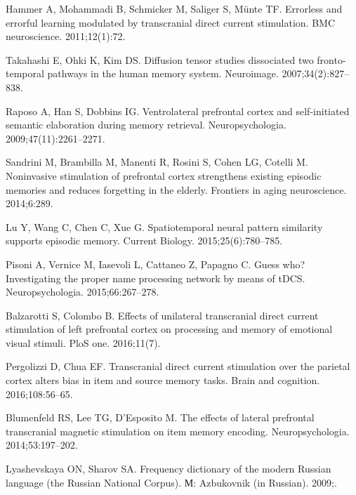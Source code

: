 \documentclass[10pt,letterpaper]{article}
\begin{document}
\begin{thebibliography}{10}
Hammer A, Mohammadi B, Schmicker M, Saliger S, M{\"u}nte TF.
\newblock Errorless and errorful learning modulated by transcranial direct
  current stimulation.
\newblock BMC neuroscience. 2011;12(1):72.

Takahashi E, Ohki K, Kim DS.
\newblock Diffusion tensor studies dissociated two fronto-temporal pathways in
  the human memory system.
\newblock Neuroimage. 2007;34(2):827--838.

Raposo A, Han S, Dobbins IG.
\newblock Ventrolateral prefrontal cortex and self-initiated semantic
  elaboration during memory retrieval.
\newblock Neuropsychologia. 2009;47(11):2261--2271.

Sandrini M, Brambilla M, Manenti R, Rosini S, Cohen LG, Cotelli M.
\newblock Noninvasive stimulation of prefrontal cortex strengthens existing
  episodic memories and reduces forgetting in the elderly.
\newblock Frontiers in aging neuroscience. 2014;6:289.

Lu Y, Wang C, Chen C, Xue G.
\newblock Spatiotemporal neural pattern similarity supports episodic memory.
\newblock Current Biology. 2015;25(6):780--785.

Pisoni A, Vernice M, Iasevoli L, Cattaneo Z, Papagno C.
\newblock Guess who? Investigating the proper name processing network by means
  of tDCS.
\newblock Neuropsychologia. 2015;66:267--278.

Balzarotti S, Colombo B.
\newblock Effects of unilateral transcranial direct current stimulation of left
  prefrontal cortex on processing and memory of emotional visual stimuli.
\newblock PloS one. 2016;11(7).

Pergolizzi D, Chua EF.
\newblock Transcranial direct current stimulation over the parietal cortex
  alters bias in item and source memory tasks.
\newblock Brain and cognition. 2016;108:56--65.

Blumenfeld RS, Lee TG, D’Esposito M.
\newblock The effects of lateral prefrontal transcranial magnetic stimulation
  on item memory encoding.
\newblock Neuropsychologia. 2014;53:197--202.

Lyashevskaya ON, Sharov SA.
\newblock Frequency dictionary of the modern Russian language (the Russian
  National Corpus).
\newblock М: Azbukovnik (in Russian). 2009;.


\end{thebibliography}
\end{document}

